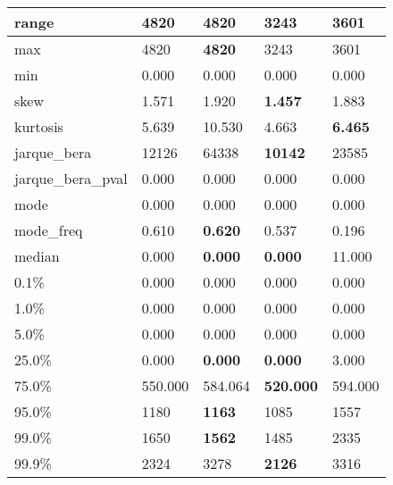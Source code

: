 \begin{table}[H]
\begin{tabular}{|l|m{10em}|m{10em}|m{10em}|m{10em}|}
\hline range & 4820 & \bfseries 4820 & \cellcolor[rgb]{0.9, 0.54, 0.52} 3243 & 3601 \\
\hline max & 4820 & \bfseries 4820 & \cellcolor[rgb]{0.9, 0.54, 0.52} 3243 & 3601 \\
\hline min & 0.000 & 0.000 & 0.000 & 0.000 \\
\hline skew & 1.571 & \cellcolor[rgb]{0.9, 0.54, 0.52} 1.920 & \bfseries 1.457 & 1.883 \\
\hline kurtosis & 5.639 & \cellcolor[rgb]{0.9, 0.54, 0.52} 10.530 & 4.663 & \bfseries 6.465 \\
\hline jarque\_bera & 12126 & \cellcolor[rgb]{0.9, 0.54, 0.52} 64338 & \bfseries 10142 & 23585 \\
\hline jarque\_bera\_pval & 0.000 & 0.000 & 0.000 & 0.000 \\
\hline mode & 0.000 & 0.000 & 0.000 & 0.000 \\
\hline mode\_freq & 0.610 & \bfseries 0.620 & 0.537 & \cellcolor[rgb]{0.9, 0.54, 0.52} 0.196 \\
\hline median & 0.000 & \bfseries 0.000 & \bfseries 0.000 & \cellcolor[rgb]{0.9, 0.54, 0.52} 11.000 \\
\hline 0.1\% & 0.000 & 0.000 & 0.000 & 0.000 \\
\hline 1.0\% & 0.000 & 0.000 & 0.000 & 0.000 \\
\hline 5.0\% & 0.000 & 0.000 & 0.000 & 0.000 \\
\hline 25.0\% & 0.000 & \bfseries 0.000 & \bfseries 0.000 & \cellcolor[rgb]{0.9, 0.54, 0.52} 3.000 \\
\hline 75.0\% & 550.000 & 584.064 & \bfseries 520.000 & \cellcolor[rgb]{0.9, 0.54, 0.52} 594.000 \\
\hline 95.0\% & 1180 & \bfseries 1163 & 1085 & \cellcolor[rgb]{0.9, 0.54, 0.52} 1557 \\
\hline 99.0\% & 1650 & \bfseries 1562 & 1485 & \cellcolor[rgb]{0.9, 0.54, 0.52} 2335 \\
\hline 99.9\% & 2324 & 3278 & \bfseries 2126 & \cellcolor[rgb]{0.9, 0.54, 0.52} 3316 \\
\hline
\end{tabular}
\end{table}
